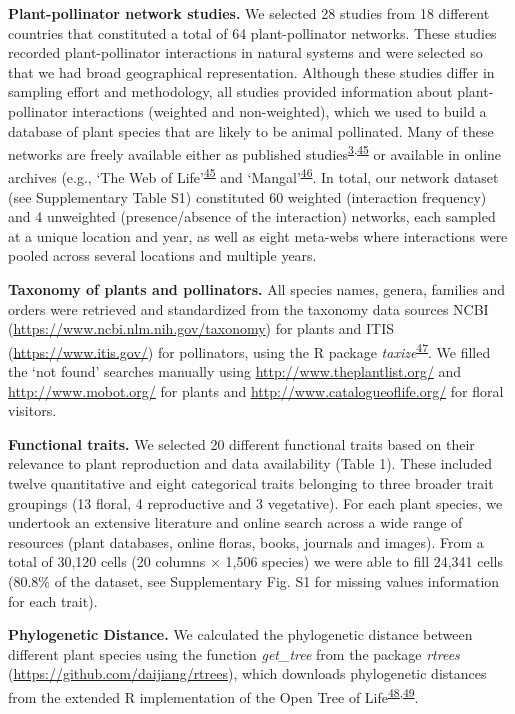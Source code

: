 \documentclass[12pt,a4paper,]{article}
\begin{document}
\textbf{Plant-pollinator network studies.} We selected 28 studies from
18 different countries that constituted a total of 64 plant-pollinator
networks. These studies recorded plant-pollinator interactions in
natural systems and were selected so that we had broad geographical
representation. Although these studies differ in sampling effort and
methodology, all studies provided information about plant-pollinator
interactions (weighted and non-weighted), which we used to build a
database of plant species that are likely to be animal pollinated. Many
of these networks are freely available either as published
studies\textsuperscript{\protect\hyperlink{ref-carvalheiro2014}{3},\protect\hyperlink{ref-fortuna2010}{45}}
or available in online archives (e.g., `The Web of
Life'\textsuperscript{\protect\hyperlink{ref-fortuna2010}{45}} and
`Mangal'\textsuperscript{\protect\hyperlink{ref-poisot2016}{46}}. In
total, our network dataset (see Supplementary Table S1) constituted 60
weighted (interaction frequency) and 4 unweighted (presence/absence of
the interaction) networks, each sampled at a unique location and year,
as well as eight meta-webs where interactions were pooled across several
locations and multiple years.

\textbf{Taxonomy of plants and pollinators.} All species names, genera,
families and orders were retrieved and standardized from the taxonomy
data sources NCBI (\url{https://www.ncbi.nlm.nih.gov/taxonomy}) for
plants and ITIS (\url{https://www.itis.gov/}) for pollinators, using the
R package
\emph{taxize}\textsuperscript{\protect\hyperlink{ref-chamberlain2020}{47}}.
We filled the `not found' searches manually using
\url{http://www.theplantlist.org/} and \url{http://www.mobot.org/} for
plants and \url{http://www.catalogueoflife.org/} for floral visitors.

\textbf{Functional traits.} We selected 20 different functional traits
based on their relevance to plant reproduction and data availability
(Table 1). These included twelve quantitative and eight categorical
traits belonging to three broader trait groupings (13 floral, 4
reproductive and 3 vegetative). For each plant species, we undertook an
extensive literature and online search across a wide range of resources
(plant databases, online floras, books, journals and images). From a
total of 30,120 cells (20 columns × 1,506 species) we were able to fill
24,341 cells (80.8\% of the dataset, see Supplementary Fig. S1 for
missing values information for each trait).

\textbf{Phylogenetic Distance.} We calculated the phylogenetic distance
between different plant species using the function \emph{get\_tree} from
the package \emph{rtrees} (\url{https://github.com/daijiang/rtrees}),
which downloads phylogenetic distances from the extended R
implementation of the Open Tree of
Life\textsuperscript{\protect\hyperlink{ref-smith2018}{48},\protect\hyperlink{ref-jin2019}{49}}.
\end{document}
